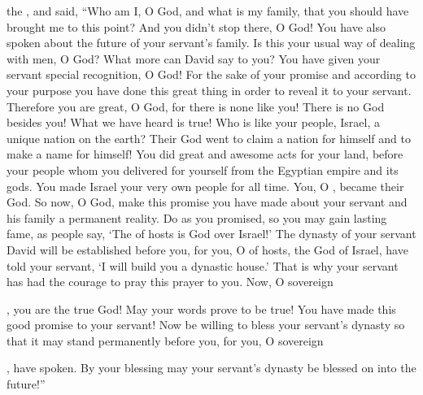 {the {}, and said,
“Who
am
I, O
{}
God,
and what
is my family,
that
you should have brought
me to this point?
And you didn’t stop
there, O
{}
God! You have also
spoken
about the future
of your servant’s
family.
Is this
your usual way
of dealing with men,
O
{}
God?
What
more
can David
say
to you? You
have given your servant
special recognition,
O
{}
God!
For the sake of
your promise
and according to your purpose
you have done
this great thing
in order to reveal
it to your servant.
Therefore
you are great,
O
{}
God,
for
there is none
like
you! There is no
God
besides
you! What we have heard
is true!
Who
is like your people,
Israel,
a unique
nation
on
the earth? Their God
went
to claim
a nation
for himself and to make
a name
for himself! You did
great
and awesome
acts for your land,
before
your people
whom
you delivered
for yourself from the Egyptian
empire
and its gods.
You made
Israel
your very
own
people
for all time. You,
O
{}, became
their God.
So now,
O
{}
God,
make this promise
you have
made about
your servant
and his family
a permanent
reality.
Do
as
you promised,
so you may gain
lasting
fame,
as people say, ‘The
{}
of hosts
is God
over
Israel!’ The dynasty
of your servant
David
will be
established
before you,
for
you,
O
{}
of hosts,
the God
of Israel,
have told your servant,
‘I will build
you a dynastic
house.’
That is why
your servant
has
had the
courage
to
pray
this
prayer
to you.
Now,
O sovereign

{}, you
are the true God! May your words
prove to be
true! You have
made this
good
promise
to
your servant!
Now
be willing
to bless
your servant’s
dynasty
so that it may
stand permanently
before
you, for
you,
O sovereign

{}, have spoken.
By your blessing
may your servant’s
dynasty
be blessed
on into the future!”

}
